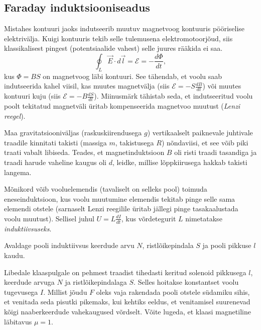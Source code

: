 \documentclass[a4paper,11pt,twocolumn]{article}
\begin{document}
\subsection{Faraday induktsiooniseadus}

Mistahes kontuuri jaoks indutseerib muutuv magnetvoog kontuuris pööriselise elektrivälja. Kuigi kontuuris tekib selle tulemusena elektromotoorjõud, siis klassikalisest pingest (potentsiaalide vahest) selle juures rääkida ei saa. 
\begin{equation}
\oint_L \vec{E} \cdot d\vec{l} = \mathcal{E} = -\frac{d\Phi}{dt} \tag{IV Maxwelli võrrand},
\end{equation}
kus $\Phi=BS$ on magnetvoog läbi kontuuri. See tähendab, et voolu saab indutseerida kahel viisil, kas muutes magnetvälja (siis $\mathcal{E}=-S\frac{dB}{dt}$) või muutes kontuuri kuju (siis $\mathcal{E}=-B\frac{dS}{dt}$). Miinusmärk tähistab seda, et indutseeritud voolu poolt tekitatud magnetväli üritab kompenseerida magnetvoo muutust (\textit{Lenzi reegel}).

\begin{question}[Piirk 2011, G8]
	Maa gravitatsiooniväljas (raskuskiirendusega $g$) vertikaalselt paiknevale juhtivale traadile kinnitati takisti (massiga $m$, takistusega $R$) nõndaviisi, et see võib piki traati vabalt libiseda. Teades, et magnetinduktsioon $B$ oli risti traadi tasandiga ja traadi harude vaheline kaugus oli $d$, leidke, millise lõppkiirusega hakkab takisti langema.
\end{question}

Mõnikord võib vooluelemendis (tavaliselt on selleks pool) toimuda eneseinduktsioon, kus voolu muutumine elemendis tekitab pinge selle sama elemendi otstele (sarnaselt Lenzi reegilile üritab jällegi pinge tasakaalustada voolu muutust). Sellisel juhul $U=L\frac{dI}{dt}$, kus võrdetegurit $L$ nimetatakse \textit{induktiivsuseks}.
	
Avaldage pooli induktiivsus keerdude arvu $N$, ristlõikepindala $S$ ja pooli pikkuse $l$ kaudu.

\begin{question}[Lõppv 2008, G10]
	Libedale klaaspulgale on pehmest traadist tihedasti keritud solenoid pikkusega $l$, keerdude arvuga $N$ ja ristlõikepindalaga $S$. Selles hoitakse konstantset voolu tugevusega $I$. Millist jõudu $F$ oleks vaja rakendada pooli otstele südamiku sihis, et venitada seda pisutki pikemaks, kui kehtiks eeldus, et venitamisel suurenevad kõigi naaberkeerdude vahekaugused võrdselt. Võite lugeda, et klaasi magnetiline läbitavus $\mu = 1$.
\end{question}
\end{document}
